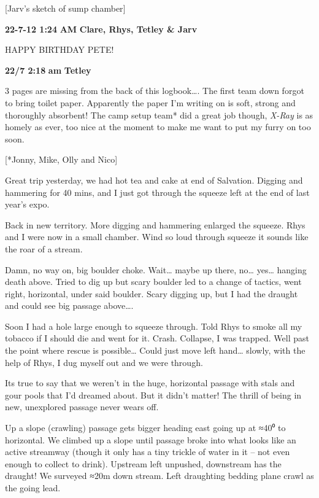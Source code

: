 {[}Jarv's sketch of sump chamber{]}

\textbf{22-7-12 1:24} \textbf{AM} \textbf{Clare, Rhys, Tetley \& Jarv}

HAPPY BIRTHDAY PETE!

\textbf{22/7 2:18} \textbf{am} \textbf{Tetley}

3 pages are missing from the back of this logbook\ldots{}. The first
team down forgot to bring toilet paper. Apparently the paper I'm writing
on is soft, strong and thoroughly absorbent! The camp setup team* did a
great job though, \emph{X-Ray} is as homely as ever, too nice at the
moment to make me want to put my furry on too soon.

{[}*Jonny, Mike, Olly and Nico{]}

Great trip yesterday, we had hot tea and cake at end of Salvation.
Digging and hammering for 40 mins, and I just got through the squeeze
left at the end of last year's expo.

Back in new territory. More digging and hammering enlarged the squeeze.
Rhys and I were now in a small chamber. Wind so loud through squeeze it
sounds like the roar of a stream.

Damn, no way on, big boulder choke. Wait\ldots{} maybe up there,
no\ldots{} yes\ldots{} hanging death above. Tried to dig up but scary
boulder led to a change of tactics, went right, horizontal, under said
boulder. Scary digging up, but I had the draught and could see big
passage above\ldots{}.

Soon I had a hole large enough to squeeze through. Told Rhys to smoke
all my tobacco if I should die and went for it. Crash. Collapse, I was
trapped. Well past the point where rescue is possible\ldots{} Could just
move left hand\ldots{} slowly, with the help of Rhys, I dug myself out
and we were through.

Its true to say that we weren't in the huge, horizontal passage with
stals and gour pools that I'd dreamed about. But it didn't matter! The
thrill of being in new, unexplored passage never wears off.

Up a slope (crawling) passage gets bigger heading east going up at ≈40⁰
to horizontal. We climbed up a slope until passage broke into what looks
like an active streamway (though it only has a tiny trickle of water in
it -- not even enough to collect to drink). Upstream left unpushed,
downstream has the draught! We surveyed ≈20m down stream. Left
draughting bedding plane crawl as the going lead.

